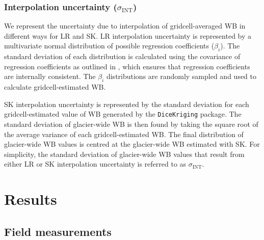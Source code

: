 \documentclass[twocolumn, letterpaper]{igs}
\begin{document}
	\subsubsection{Interpolation uncertainty ($\sigma_{\mathrm{INT}}$)}
We represent the uncertainty due to interpolation of gridcell-averaged WB in different ways for LR and SK. LR interpolation uncertainty is represented by a multivariate normal distribution of possible regression coefficients ($\beta_i$). The standard deviation of each distribution is calculated using the covariance of regression coefficients as outlined in \cite{Bagos2015}, which ensures that regression coefficients are internally consistent. The $\beta_i$ distributions are randomly sampled and used to calculate gridcell-estimated WB.

SK interpolation uncertainty is represented by the standard deviation for each gridcell-estimated value of WB generated by the \texttt{DiceKriging} package. The standard deviation of glacier-wide WB is then found by taking the square root of the average variance of each gridcell-estimated WB. The final distribution of glacier-wide WB values is centred at the glacier-wide WB estimated with SK. For simplicity, the standard deviation of glacier-wide WB values that result from either LR or SK interpolation uncertainty is referred to as $\sigma_{\mathrm{INT}}$.



\section{Results}

\subsection{Field measurements}
\end{document}
